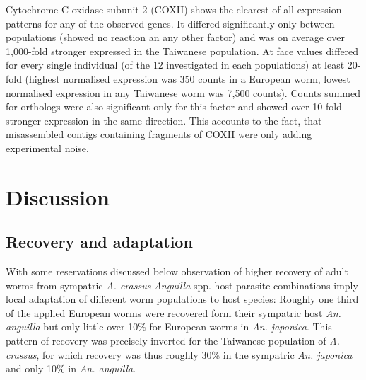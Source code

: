\documentclass[10pt]{article}
\begin{document}
Cytochrome C oxidase subunit 2 (COXII) shows the clearest of all
expression patterns for any of the observed genes. It differed
significantly only between populations (showed no reaction an any
other factor) and was on average over 1,000-fold stronger expressed in
the Taiwanese population. At face values differed for every single
individual (of the 12 investigated in each populations) at least
20-fold (highest normalised expression was 350 counts in a European
worm, lowest normalised expression in any Taiwanese worm was 7,500
counts). Counts summed for orthologs were also significant only for
this factor and showed over 10-fold stronger expression in the same
direction. This accounts to the fact, that misassembled contigs
containing fragments of COXII were only adding experimental noise.

\section{Discussion}



\subsection{Recovery and adaptation}
\label{sec:recovery}

With some reservations discussed below observation of higher recovery
of adult worms from sympatric \textit{A. crassus}-\textit{Anguilla}
spp. host-parasite combinations imply local adaptation of different
worm populations to host species: Roughly one third of the applied
European worms were recovered form their sympatric host
\textit{An. anguilla} but only little over 10\% for European worms in
\textit{An. japonica}. This pattern of recovery was precisely inverted
for the Taiwanese population of \textit{A. crassus}, for which
recovery was thus roughly 30\% in the sympatric \textit{An. japonica}
and only 10\% in \textit{An. anguilla}. 
\end{document}
